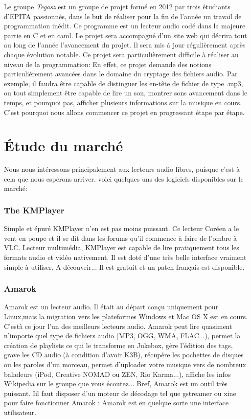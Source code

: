 \documentclass[12pt]{report}
\begin{document}
Le groupe\textit{ Tegasz} est un groupe de projet formé en 2012 par trois  étudiants d'EPITA passionnés, dans le but de réaliser pour la fin de l'année un travail de programmation inédit. Ce programme est un lecteur audio codé dans la majeure partie en C et en caml. Le projet sera accompagné d'un site web qui décrira tout au long de l'année l'avancement du projet. Il sera mis à  jour régulièrement après chaque évolution notable.
Ce projet sera particulièrement difficile à  réaliser au niveau de la programmation:
En effet, ce projet demande des notions particulièrement avancées dans le domaine du cryptage des fichiers audio. Par exemple, il faudra être capable de distinguer les en-tête de fichier de type .mp3, ou tout simplement être capable de lire un son, montrer sons avancement dans le temps, et pourquoi pas, afficher plusieurs informations sur la musique en cours.
 C'est pourquoi nous allons commencer ce projet en progressant étape par étape.

\newpage

	\section{Étude du marché}
Nous nous intéressons principalement aux lecteurs audio libres, puisque c'est à  cela que nous espérons arriver. voici quelques uns des logiciels disponibles sur le marché:

			\subsubsection{The KMPlayer}

Simple et épuré KMPlayer n'en est pas moins puissant. Ce lecteur Coréen a le vent en poupe et il se dit dans les forums qu'il commence à faire de l'ombre à VLC. Lecteur multimédia, KMPlayer est capable de lire pratiquement tous les formats audio et vidéo nativement. Il est doté d'une très belle interface vraiment simple à  utiliser. A découvrir... Il est gratuit et un patch français est disponible.

\subsubsection{Amarok}

Amarok est un lecteur audio. Il était au départ conçu uniquement pour Linux,mais la migration vers les plateformes Windows et Mac OS X est en cours. C'est\`a ce jour l'un des meilleurs lecteurs audio. 
 Amarok peut lire quasiment n'importe quel type de fichiers audio (MP3, OGG, WMA, FLAC...), permet la création de playlists ce qui le transforme en Jukebox, gère l'édition des tags, grave les CD audio (à condition d'avoir K3B), récupère les pochettes de disques ou les paroles d'un morceau, permet d'uploader votre musique vers de nombreux baladeurs (iPod, Creative NOMAD ou ZEN, Rio Karma...), affiche les infos Wikipedia sur le groupe que vous écoutez... Bref, Amarok est un outil très puissant.
Iil faut disposer d'un moteur de décodage tel que gstreamer ou xine pour faire fonctionner Amarok : Amarok est en quelque sorte une interface utilisateur. 
\end{document}
